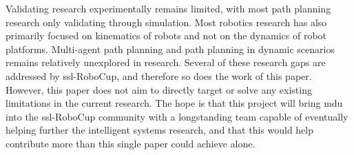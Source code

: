 Validating research experimentally remains limited, with most path planning research only validating through simulation\:\cite{borkar_stability_2023}. 
Most robotics research has also primarily focused on kinematics of robots and not on the dynamics of robot platforms\:\cite{borkar_stability_2023}.
Multi-agent path planning and path planning in dynamic scenarios remains relatively unexplored in research\:\cite{borkar_stability_2023}. Several of these research gaps are addressed by \ac{ssl}-RoboCup, and therefore so does the work of this paper.
However, this paper does not aim to directly target or solve any existing limitations in the current research. The hope is that this project will bring \ac{mdu} into the \ac{ssl}-RoboCup community with a longstanding team capable of eventually helping further the intelligent systems research, and that this would help contribute more than this single paper could achieve alone.


\begin{comment}
The purpose of this section is to place your work in context and compare it with previous published work and results in the field. This section should be thorough. You describe here existing knowledge and how this is extended by your work. It should include analyses of previous work, describing, for example, how different methods differ. You should point out the main similarities and differences in terms of task, approach/methodology and results. It is important that you discuss in a neutral way the advantages and disadvantages of your own work compared to that of others.

This also creates an expectation of the contribution of your work, the reader learns here about the limitations of previous work and why your task is a challenge.. 

Together, this section along with the background will introduce the state of the art/state of practice and its shortcomings, the importance of the assignment and what your work will be compared to.
\end{comment}

